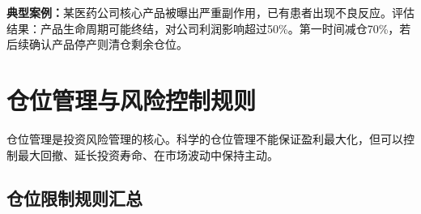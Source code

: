 \begin{exhibitbox}[表9-21：个股黑天鹅事件调仓指南]
\textbf{典型案例：}某医药公司核心产品被曝出严重副作用，已有患者出现不良反应。评估结果：产品生命周期可能终结，对公司利润影响超过50\%。第一时间减仓70\%，若后续确认产品停产则清仓剩余仓位。
\end{exhibitbox}

\section{仓位管理与风险控制规则}

仓位管理是投资风险管理的核心。科学的仓位管理不能保证盈利最大化，但可以控制最大回撤、延长投资寿命、在市场波动中保持主动。

\subsection{仓位限制规则汇总}

